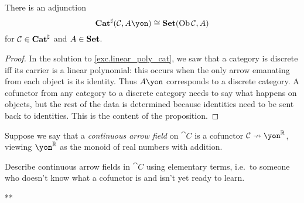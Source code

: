 \documentclass[Book-Poly]{subfiles}
\begin{document}
\begin{proposition}
There is an adjunction
\[
\smcat^\sharp(\cat{C},A\yon)\cong\smset(\Ob\cat{C},A)
\]
for $\mathcal{C}\in\mathbf{Cat}^\sharp$ and $A\in\mathbf{Set}$.
\end{proposition}
\begin{proof}
In the solution to \cref{exc.linear_poly_cat}, we saw that a category is discrete iff its carrier is a linear polynomial: this occurs when the only arrow emanating from each object is its identity. Thus $A\yon$ corresponds to a discrete category. A cofunctor from any category to a discrete category needs to say what happens on objects, but the rest of the data is determined because identities need to be sent back to identities. This is the content of the proposition.
\end{proof}

\begin{exercise}
Suppose we say that a \emph{continuous arrow field} on $\cat{C}$ is a cofunctor $\cat{C}\cof\yon^\rr$, viewing $\yon^\rr$ as the monoid of real numbers with addition.

Describe continuous arrow fields in $\cat{C}$ using elementary terms, i.e.\ to someone who doesn't know what a cofunctor is and isn't yet ready to learn.
\begin{solution}
**
\end{solution}
\end{exercise}
\end{document}
